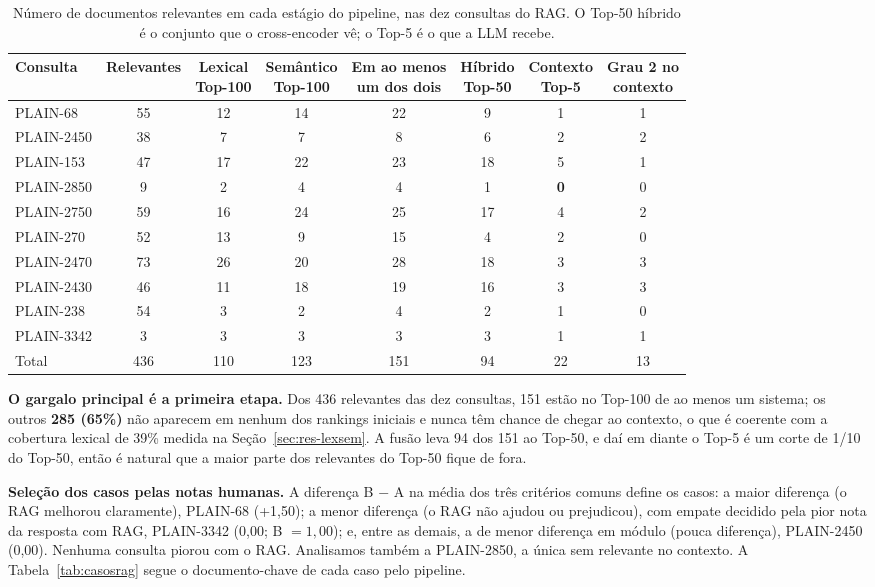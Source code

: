 \documentclass[10pt,a4paper]{article}
\newcommand{\pq}[1]{\mbox{PLAIN-#1}}        %
\begin{document}
\begin{table}[!htb]
\centering\small
\caption{Número de documentos relevantes em cada estágio do pipeline, nas dez consultas do RAG. O Top-50 híbrido é o conjunto que o cross-encoder vê; o Top-5 é o que a LLM recebe.}
\label{tab:trace}
\begin{tabular}{@{}lccccccc@{}}
\toprule
Consulta & Relevantes & \makecell{Lexical\\Top-100} & \makecell{Semântico\\Top-100} & \makecell{Em ao menos\\um dos dois} & \makecell{Híbrido\\Top-50} & \makecell{Contexto\\Top-5} & \makecell{Grau 2 no\\contexto} \\
\midrule
\pq{68}   & 55 & 12 & 14 & 22 &  9 & 1 & 1 \\
\pq{2450} & 38 &  7 &  7 &  8 &  6 & 2 & 2 \\
\pq{153}  & 47 & 17 & 22 & 23 & 18 & 5 & 1 \\
\pq{2850} &  9 &  2 &  4 &  4 &  1 & \textbf{0} & 0 \\
\pq{2750} & 59 & 16 & 24 & 25 & 17 & 4 & 2 \\
\pq{270}  & 52 & 13 &  9 & 15 &  4 & 2 & 0 \\
\pq{2470} & 73 & 26 & 20 & 28 & 18 & 3 & 3 \\
\pq{2430} & 46 & 11 & 18 & 19 & 16 & 3 & 3 \\
\pq{238}  & 54 &  3 &  2 &  4 &  2 & 1 & 0 \\
\pq{3342} &  3 &  3 &  3 &  3 &  3 & 1 & 1 \\
\midrule
Total & 436 & 110 & 123 & 151 & 94 & 22 & 13 \\
\bottomrule
\end{tabular}
\end{table}

\textbf{O gargalo principal é a primeira etapa.} Dos 436 relevantes das dez consultas, 151 estão no Top-100 de ao menos um sistema; os outros \textbf{285 (65\%)} não aparecem em nenhum dos rankings iniciais e nunca têm chance de chegar ao contexto, o que é coerente com a cobertura lexical de 39\% medida na Seção~\ref{sec:res-lexsem}. A fusão leva 94 dos 151 ao Top-50, e daí em diante o Top-5 é um corte de 1/10 do Top-50, então é natural que a maior parte dos relevantes do Top-50 fique de fora.

\textbf{Seleção dos casos pelas notas humanas.} A diferença B $-$ A na média dos três critérios comuns define os casos: a maior diferença (o RAG melhorou claramente), \pq{68} (+1,50); a menor diferença (o RAG não ajudou ou prejudicou), com empate decidido pela pior nota da resposta com RAG, \pq{3342} (0,00; B $= 1{,}00$); e, entre as demais, a de menor diferença em módulo (pouca diferença), \pq{2450} (0,00). Nenhuma consulta piorou com o RAG. Analisamos também a \pq{2850}, a única sem relevante no contexto. A Tabela~\ref{tab:casosrag} segue o documento-chave de cada caso pelo pipeline.
\end{document}
